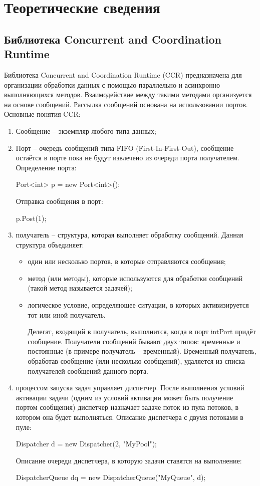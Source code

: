 \documentclass[russian,utf8,pointsection]{eskdtext}
\begin{document}
	\lstset{
		language=Java,
		basicstyle=\footnotesize
	}
	
	
    \section{Теоретические сведения}
    \subsection{Библиотека Concurrent and Coordination Runtime}
    Библиотека Concurrent and Coordination Runtime (CCR) предназначена для организации обработки данных с помощью параллельно и асинхронно
    выполняющихся методов. Взаимодействие между такими методами организуется на основе сообщений. Рассылка сообщений основана на     использовании портов.
    Основные понятия CCR:
    \begin{enumerate}
    \item Сообщение – экземпляр любого типа данных;
    \item Порт – очередь сообщений типа FIFO (First-In-First-Out), сообщение остаётся в порте пока не будут извлечено из очереди порта     получателем.
    Определение порта:
    
    Port<int> p = new Port<int>();
    
    Отправка сообщения в порт:
    
    p.Post(1);
    
    \item получатель – структура, которая выполняет обработку сообщений.
    Данная структура объединяет:
    	\begin{itemize}
   \item один или несколько портов, в которые отправляются сообщения;
    \item метод (или методы), которые используются для обработки сообщений (такой метод называется задачей);
    \item логическое условие, определяющее ситуации, в которых активизируется тот или иной получатель.
    
    Делегат, входящий в получатель, выполнится, когда в порт intPort придёт сообщение.
    Получатели сообщений бывают двух типов: временные и постоянные (в примере получатель – временный). Временный получатель, обработав
    сообщение (или несколько сообщений), удаляется из списка получателей сообщений данного порта.
    \end{itemize}
        
    \item процессом запуска задач управляет диспетчер. После выполнения условий активации задачи (одним из условий активации может быть
    получение портом сообщения) диспетчер назначает задаче поток из пула потоков, в котором она будет выполняться.
    Описание диспетчера с двумя потоками в пуле:
    
    Dispatcher d = new Dispatcher(2, "MyPool");
    
    Описание очереди диспетчера, в которую задачи ставятся на выполнение:
    
    DispatcherQueue dq = new DispatcherQueue("MyQueue", d);
    
    \end{enumerate}
    
\end{document}
